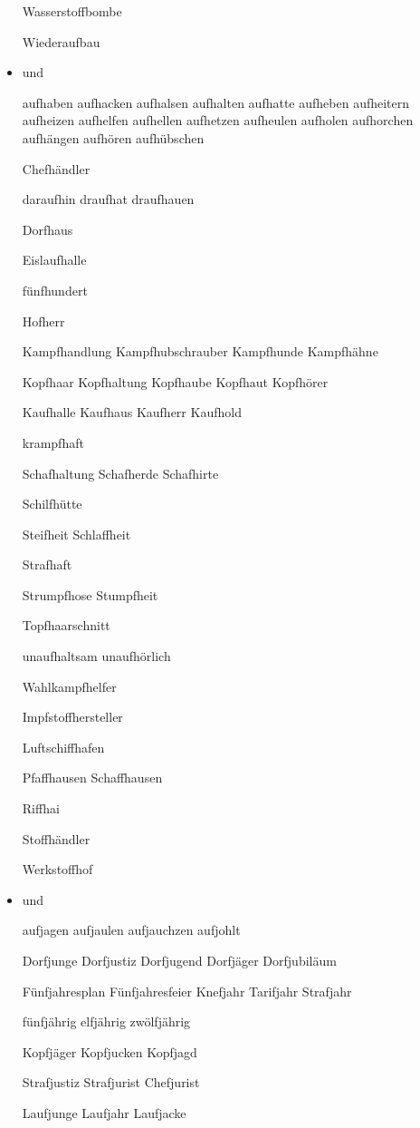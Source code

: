 \begin{itemize}
Wasserstoffbombe

Wiederaufbau
 

\item {} und 


aufhaben aufhacken aufhalsen aufhalten aufhatte aufheben aufheitern aufheizen aufhelfen aufhellen aufhetzen aufheulen aufholen aufhorchen aufhängen aufhören aufhübschen

Chefhändler

daraufhin draufhat draufhauen 

Dorfhaus

Eislaufhalle

fünfhundert 

Hofherr

Kampfhandlung Kampfhubschrauber Kampfhunde Kampfhähne

Kopfhaar Kopfhaltung Kopfhaube Kopfhaut Kopfhörer

Kaufhalle Kaufhaus Kaufherr Kaufhold 

krampfhaft

Schafhaltung Schafherde Schafhirte 

Schilfhütte

Steifheit Schlaffheit 

Strafhaft

Strumpfhose Stumpfheit

Topfhaarschnitt

unaufhaltsam unaufhörlich

Wahlkampfhelfer

Impfstoffhersteller 

Luftschiffhafen

Pfaffhausen Schaffhausen

Riffhai

Stoffhändler

Werkstoffhof



\item {} und 


aufjagen aufjaulen aufjauchzen aufjohlt

Dorfjunge Dorfjustiz Dorfjugend Dorfjäger Dorfjubiläum

Fünfjahresplan Fünfjahresfeier Knefjahr Tarifjahr Strafjahr

fünfjährig elfjährig zwölfjährig 

Kopfjäger Kopfjucken Kopfjagd

Strafjustiz Strafjurist Chefjurist

Laufjunge Laufjahr Laufjacke 


\end{itemize}
